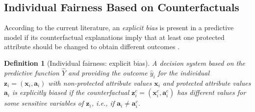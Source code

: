 \documentclass[letterpaper]{article} %
\newtheorem{definition}{Definition}
\DeclareMathOperator*{\argmin}{arg\,min}
\begin{document}
%
%


\subsection{Individual Fairness Based on Counterfactuals}


According to the current literature, an \emph{explicit bias} is present in a predictive model if its counterfactual explanations imply that at least one protected attribute should be changed to obtain different outcomes \cite{sokol2022fat}.

\begin{definition}[Individual fairness: explicit bias]\label{explicit_bias}
	A decision system based on the predictive function $\hat{Y}$ and providing the outcome $\hat{y}_i$ for the individual $\boldsymbol{z}_i = (\boldsymbol{x}_i, \boldsymbol{a}_i)$ with non-protected attribute values $\boldsymbol{x}_{i}$ and protected attribute values $\boldsymbol{a}_{i}$ is \emph{explicitly biased} if the counterfactual $\boldsymbol{z}_i^c = (\boldsymbol{x}_i^c, \boldsymbol{a}_i^c)$ has different values for some sensitive variables of $\boldsymbol{z}_i$, i.e., if $\boldsymbol{a}_{i} \neq \boldsymbol{a}_{i}^{c}$.
\end{definition}
\end{document}
